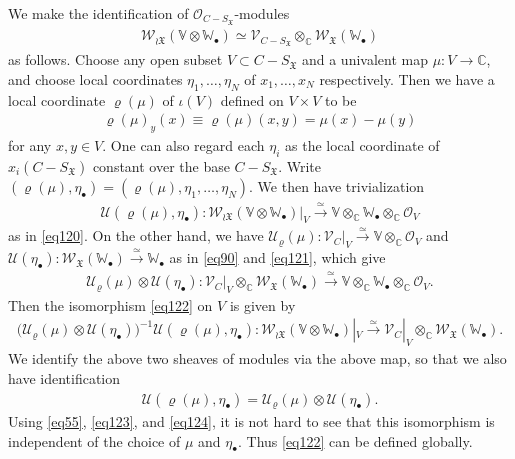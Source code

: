 \documentclass[12pt,b5paper,notitlepage]{report}
\theoremstyle{definition}
\theoremstyle{plain}
\newcommand{\fk}{\mathfrak}
\newcommand{\mc}{\mathcal}
\newcommand{\scr}{\mathscr}
\newcommand{\blt}{\bullet}
\newcommand{\Vbb}{\mathbb V}
\newcommand{\Wbb}{\mathbb W}
\newcommand{\Cbb}{\mathbb C}
\numberwithin{equation}{section}
\begin{document}
We make the identification of $\scr O_{C-S_{\fk X}}$-modules
\begin{align}
\scr W_{\wr\fk X}(\Vbb\otimes\Wbb_\blt)\simeq \scr V_{C-S_{\fk X}}\otimes_\Cbb\scr W_{\fk X}(\Wbb_\blt)\label{eq122}
\end{align}
as follows. Choose any open subset $V\subset C-S_{\fk X}$ and a univalent map $\mu:V\rightarrow \Cbb$, and choose local coordinates $\eta_1,\dots,\eta_N$ of $x_1,\dots,x_N$ respectively. Then we have a local coordinate $\varrho(\mu)$ of $\iota(V)$ defined on $V\times V$ to be
\begin{align}
\varrho(\mu)_y(x)\equiv\varrho(\mu)(x,y)=\mu(x)-\mu(y)\label{eq128}
\end{align}
for any $x,y\in V$. One can also regard each $\eta_i$ as the local coordinate of $x_i(C-S_{\fk X})$ constant over the base $C-S_{\fk X}$. Write $(\varrho(\mu),\eta_\blt)=(\varrho(\mu),\eta_1,\dots,\eta_N)$. We then have trivialization
\begin{align*}
\mc U(\varrho(\mu),\eta_\blt):\scr W_{\wr\fk X}(\Vbb\otimes\Wbb_\blt)|_V\xrightarrow{\simeq} \Vbb\otimes_\Cbb\Wbb_\blt\otimes_\Cbb\scr O_V
\end{align*}
as in \eqref{eq120}. On the other hand, we have $\mc U_\varrho(\mu):\scr V_C|_V\xrightarrow{\simeq}\Vbb\otimes_\Cbb\scr O_V$ and $\mc U(\eta_\blt):\scr W_{\fk X}(\Wbb_\blt)\xrightarrow{\simeq}\Wbb_\blt$ as in \eqref{eq90} and \eqref{eq121}, which give
\begin{align*}
\mc U_\varrho(\mu)\otimes \mc U(\eta_\blt):\scr V_C|_V\otimes_\Cbb\scr W_{\fk X}(\Wbb_\blt)\xrightarrow{\simeq} \Vbb\otimes_\Cbb\Wbb_\blt\otimes_\Cbb\scr O_V.
\end{align*}
Then the isomorphism \eqref{eq122} on $V$ is given by
\begin{align}
\big(\mc U_\varrho(\mu)\otimes \mc U(\eta_\blt)\big)^{-1}\mc U(\varrho(\mu),\eta_\blt):\scr W_{\wr\fk X}(\Vbb\otimes\Wbb_\blt)|_V\xrightarrow{\simeq} \scr V_C|_V\otimes_\Cbb\scr W_{\fk X}(\Wbb_\blt).\label{eq129}
\end{align}
We identify the above two sheaves of modules via the above map, so that we also have identification
\begin{align}
\mc U(\varrho(\mu),\eta_\blt)=\mc U_\varrho(\mu)\otimes \mc U(\eta_\blt).\label{eq126}
\end{align}
Using \eqref{eq55}, \eqref{eq123}, and \eqref{eq124}, it is not hard to see that this isomorphism is independent of the choice of $\mu$ and $\eta_\blt$. Thus \eqref{eq122} can be defined globally.
\end{document}
